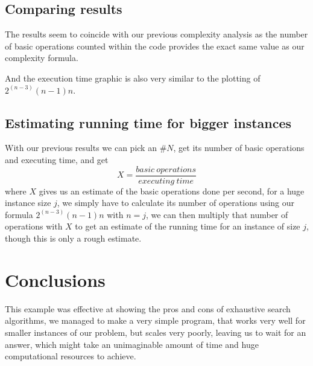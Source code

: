 \documentclass[...]{revdetua}
\begin{document}
\subsection{Comparing results}
The results seem to coincide with our previous complexity analysis as the number of basic operations counted within the code provides the exact same value as our complexity formula.\par
And the execution time graphic is also very similar to the plotting of ${2^{(n-3)}(n-1)n}$.
\subsection{Estimating running time for bigger instances}
With our previous results we can pick an $\#N$, get its number of basic operations and executing time, and get $$X=\frac{basic\ operations}{executing\ time}$$ where $X$ gives us an estimate of the basic operations done per second, for a huge instance size $j$, we simply have to calculate its number of operations using  our formula $2^{(n-3)}(n-1)n$ with $n=j$, we can then multiply that number of operations with $X$ to get an estimate of the running time for an instance of size $j$, though this is only a rough estimate.

\section{Conclusions}
This example was effective at showing the pros and cons of exhaustive search algorithms, we managed to make a very simple program, that works very well for smaller instances of our problem, but scales very poorly, leaving us to wait for an answer, which might take an unimaginable amount of time and huge computational resources to achieve.




\end{document}
